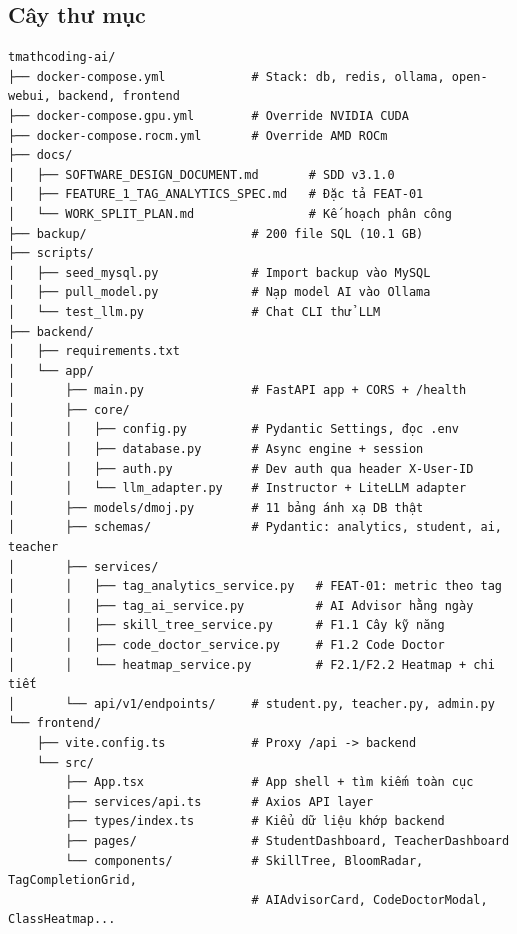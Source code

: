 \documentclass[11pt,a4paper]{article}
\begin{document}
\subsection{Cây thư mục}

\begin{Verbatim}[frame=single, framesep=4pt, rulecolor=\color{gray!60}]
tmathcoding-ai/
├── docker-compose.yml            # Stack: db, redis, ollama, open-webui, backend, frontend
├── docker-compose.gpu.yml        # Override NVIDIA CUDA
├── docker-compose.rocm.yml       # Override AMD ROCm
├── docs/
│   ├── SOFTWARE_DESIGN_DOCUMENT.md       # SDD v3.1.0
│   ├── FEATURE_1_TAG_ANALYTICS_SPEC.md   # Đặc tả FEAT-01
│   └── WORK_SPLIT_PLAN.md                # Kế hoạch phân công
├── backup/                       # 200 file SQL (10.1 GB)
├── scripts/
│   ├── seed_mysql.py             # Import backup vào MySQL
│   ├── pull_model.py             # Nạp model AI vào Ollama
│   └── test_llm.py               # Chat CLI thử LLM
├── backend/
│   ├── requirements.txt
│   └── app/
│       ├── main.py               # FastAPI app + CORS + /health
│       ├── core/
│       │   ├── config.py         # Pydantic Settings, đọc .env
│       │   ├── database.py       # Async engine + session
│       │   ├── auth.py           # Dev auth qua header X-User-ID
│       │   └── llm_adapter.py    # Instructor + LiteLLM adapter
│       ├── models/dmoj.py        # 11 bảng ánh xạ DB thật
│       ├── schemas/              # Pydantic: analytics, student, ai, teacher
│       ├── services/
│       │   ├── tag_analytics_service.py   # FEAT-01: metric theo tag
│       │   ├── tag_ai_service.py          # AI Advisor hằng ngày
│       │   ├── skill_tree_service.py      # F1.1 Cây kỹ năng
│       │   ├── code_doctor_service.py     # F1.2 Code Doctor
│       │   └── heatmap_service.py         # F2.1/F2.2 Heatmap + chi tiết
│       └── api/v1/endpoints/     # student.py, teacher.py, admin.py
└── frontend/
    ├── vite.config.ts            # Proxy /api -> backend
    └── src/
        ├── App.tsx               # App shell + tìm kiếm toàn cục
        ├── services/api.ts       # Axios API layer
        ├── types/index.ts        # Kiểu dữ liệu khớp backend
        ├── pages/                # StudentDashboard, TeacherDashboard
        └── components/           # SkillTree, BloomRadar, TagCompletionGrid,
                                  # AIAdvisorCard, CodeDoctorModal, ClassHeatmap...
\end{Verbatim}

\end{document}
